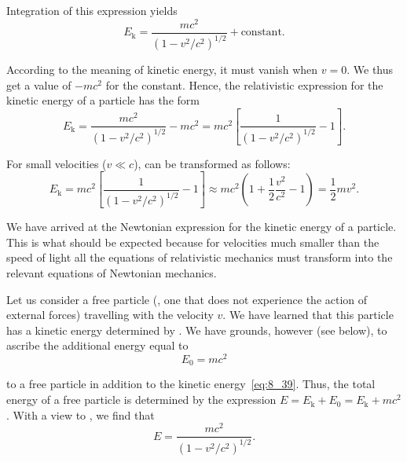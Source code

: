 \noindent
Integration of this expression yields
\begin{equation}\label{eq:8_38}
	E_{\text{k}} = \frac{mc^2}{\left(1-v^2/c^2\right)^{1/2}} + \text{constant}.
\end{equation}

\noindent
According to the meaning of kinetic energy, it must vanish when $v=0$. We thus get a value of $-mc^2$ for the constant. Hence, the relativistic expression for the kinetic energy of a particle has the form
\begin{equation}\label{eq:8_39}
	E_{\text{k}} = \frac{mc^2}{\left(1-v^2/c^2\right)^{1/2}} - mc^2 = mc^2\left[\frac{1}{\left(1-v^2/c^2\right)^{1/2}} - 1\right].
\end{equation}

For small velocities ($v\ll c$),  can be transformed as follows:
\begin{equation*}
	E_{\text{k}} = mc^2 \left[\frac{1}{\left(1-v^2/c^2\right)^{1/2}} - 1\right]\approx mc^2\left(1 + \frac{1}{2}\frac{v^2}{c^2} - 1\right) = \frac{1}{2}mv^2.
\end{equation*}

\noindent
We have arrived at the Newtonian expression for the kinetic energy of a particle. This is what should be expected because for velocities much smaller than the speed of light all the equations of relativistic mechanics must transform into the relevant equations of Newtonian mechanics.

Let us consider a free particle (\ie, one that does not experience the action of external forces) travelling with the velocity $v$. We have learned that this particle has a kinetic energy determined by . We have grounds, however (see below), to ascribe the additional energy equal to
\begin{equation}\label{eq:8_40}
	E_0 = mc^2
\end{equation}

\noindent
to a free particle in addition to the kinetic energy~\eqref{eq:8_39}. Thus, the total energy of a free particle is determined by the expression $E=E_{\text{k}}+E_0=E_{\text{k}}+mc^2$. With a view to , we find that
\begin{equation}\label{eq:8_41}
	E = \frac{mc^2}{\left(1-v^2/c^2\right)^{1/2}}.
\end{equation}

